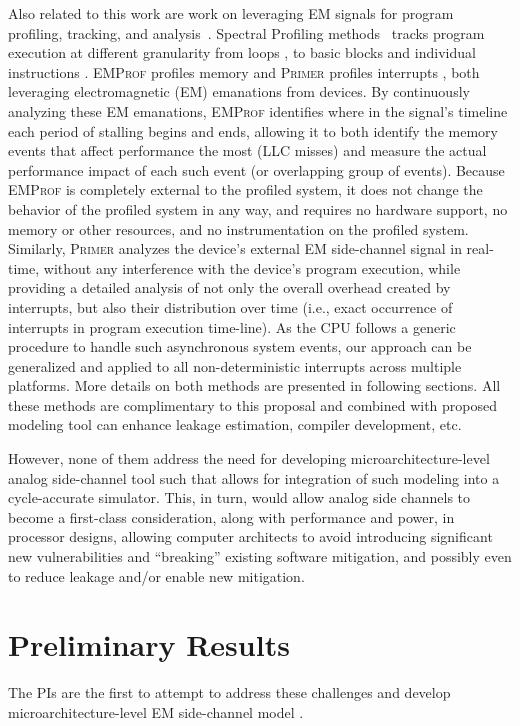 \documentclass[11 pt]{article}
\begin{document}
Also related to this work are work on leveraging EM signals for program profiling, tracking, and analysis~\cite{7783762,Gorman:2017:AON:3123939.3123973,Elvan2021,Zop, Zop2,Moumita2018,Moumita2022}. Spectral Profiling methods~\cite{7783762,Zop,Zop2,Elvan2021} tracks program execution at different granularity from loops \cite{7783762}, to basic blocks \cite{Zop,Zop2} and individual instructions \cite{Elvan2021}. \textsc{EMProf} profiles memory \cite{Moumita2018} and \textsc{Primer} profiles interrupts \cite{Moumita2022}, both leveraging electromagnetic (EM) emanations from devices. By continuously analyzing these EM emanations, \textsc{EMProf} identifies where in the signal's timeline each period of stalling begins and ends, allowing it to both identify the memory events that affect performance the most (LLC misses) and measure the actual performance impact of each such event (or overlapping group of events). Because \textsc{EMProf} is completely external to the profiled system, it does not change the behavior of the profiled system in any way, and requires no hardware support, no memory or other resources, and no instrumentation on the profiled system. Similarly, \textsc{Primer} analyzes the device's external EM side-channel signal in real-time, without any interference with the device's program execution, while providing a detailed analysis of not only the overall overhead created by interrupts, but also their distribution over time (i.e., exact occurrence of interrupts in program execution time-line). As the CPU follows a generic procedure to handle such asynchronous system events, our approach can be generalized and applied to all non-deterministic interrupts across multiple platforms. More details on both methods are presented in following sections. All these methods are complimentary to this proposal and combined with proposed modeling tool can enhance leakage estimation, compiler development, etc.

However, none of them address the need for developing microarchitecture-level analog side-channel tool such that allows for integration of such modeling into a cycle-accurate simulator. This, in turn, would allow analog side channels to become a first-class consideration, along with performance and power, in processor designs, allowing computer architects to avoid introducing significant new vulnerabilities and ``breaking'' existing software mitigation, and possibly even to reduce leakage and/or enable new mitigation.

\section{Preliminary Results}
The PIs are the first to attempt to address these challenges and develop microarchitecture-level EM side-channel model \cite{Nader2020}.
\end{document}
